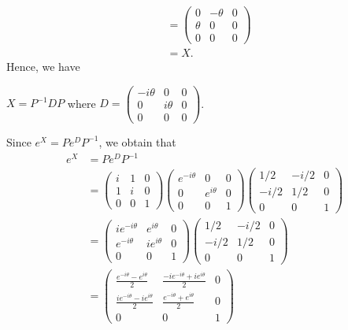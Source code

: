 \documentclass[a4paper]{article}
\begin{document}
\begin{solution}
\begin{align*}
               &= \begin{pmatrix} 0 & - \theta & 0 \\ \theta & 0 & 0  \\ 0 & 0 & 0  \end{pmatrix} \\ 
               &= X. 
\end{align*}
Hence, we have 
\begin{center}
    \( X = P^{-1} D P  \) where \( D = \displaystyle \begin{pmatrix} - i \theta & 0 & 0 \\ 0 & i \theta &  0 \\ 0 & 0 & 0   \end{pmatrix}  \).
\end{center}
Since \( e^{X} = P e^{D} P^{-1} \), we obtain that 
\begin{align*}
    e^{X} &= P e^{D} P^{-1} \\
          &= \begin{pmatrix} i & 1 & 0 \\ 1 & i & 0 \\ 0 & 0 & 1  \end{pmatrix}  \begin{pmatrix} e^{-i \theta } & 0 & 0 \\ 0 & e^{i \theta} & 0  \\  0 & 0 & 1  \end{pmatrix} \begin{pmatrix} 1/2 & -i/2 & 0 \\ -i/2 & 1/2 & 0 \\ 0 & 0 & 1  \end{pmatrix}  \\ 
          &= \begin{pmatrix} i e^{-i \theta} & e^{i \theta} & 0 \\ e^{-i \theta} & i e^{i \theta} & 0 \\ 0 & 0 & 1  \end{pmatrix} \begin{pmatrix}  1/2 & - i / 2 & 0 \\ -i /2 & 1/2 & 0 \\ 0 & 0 & 1  \end{pmatrix} \\
          &= \begin{pmatrix} \frac{ e^{-i \theta} - e^{i \theta} }{  2  }  & \frac{ - i e^{-i \theta} +  i e^{i \theta}  }{  2  }  & 0 \\ \frac{ i e^{-i \theta} - i e^{i \theta} }{  2  }  &  \frac{ e^{- i \theta} + e^{i \theta} }{  2  }  & 0  \\ 0 & 0 & 1  \end{pmatrix} \\

\end{align*}
\end{solution}
\end{document}
